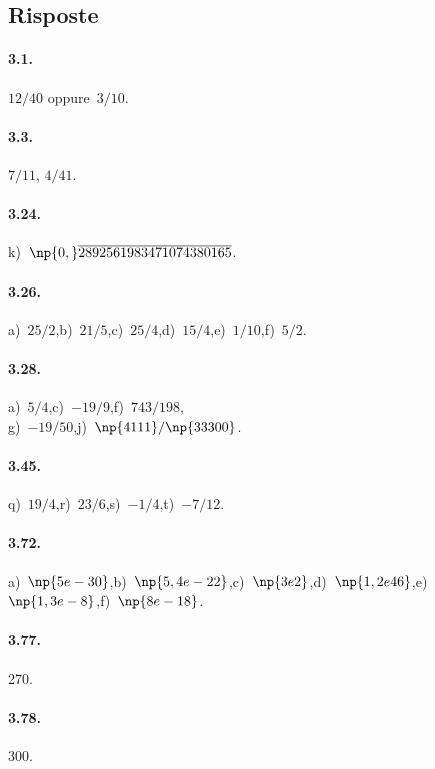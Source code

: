\subsection{Risposte}
\begin{multicols}{2}
\paragraph{3.1.}$12/40$ oppure~$3/10$.

\paragraph{3.3.} $7/11$, $4/41$.

\paragraph{3.24.} k)~$\np{0,}\overline{2892561983471074380165}$.

\paragraph{3.26.} a)~$25/2$,\quad b)~$21/5$,\quad c)~$25/4$,\quad d)~$15/4$,\quad e)~$1/10$,\quad f)~$5/2$.

\paragraph{3.28.} a)~$5/4$,\quad c)~$-19/9$,\quad f)~$743/198$,\protect\\g)~$-19/50$,\quad j)~$\np{4111}/\np{33300}$.

\paragraph{3.45.} q)~$19/4$,\quad r)~$23/6$,\quad s)~$-1/4$,\quad t)~$-7/12$.

\paragraph{3.72.} a)~$\np{5e-30}$,\quad b)~$\np{5,4e-22}$,\quad c)~$\np{3e2}$,\quad d)~$\np{1,2e46}$,\quad e)~$\np{1,3e-8}$,\quad f)~$\np{8e-18}$.

\paragraph{3.77.} 270.

\paragraph{3.78.} 300.


\end{multicols}
